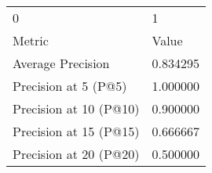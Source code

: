 \begin{tabular}{ll}
0 & 1 \\
Metric & Value \\
Average Precision & 0.834295 \\
Precision at 5 (P@5) & 1.000000 \\
Precision at 10 (P@10) & 0.900000 \\
Precision at 15 (P@15) & 0.666667 \\
Precision at 20 (P@20) & 0.500000 \\
\end{tabular}
